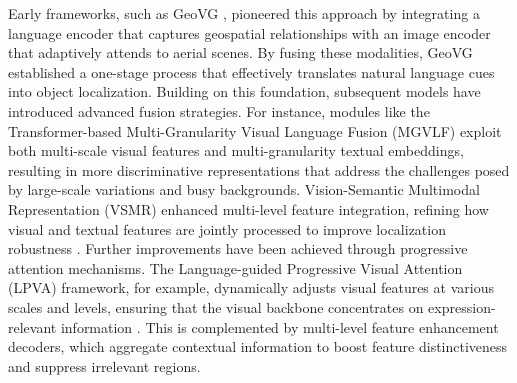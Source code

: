 Early frameworks, such as GeoVG \citep{sun2022visual}, pioneered this approach by integrating a language encoder that captures geospatial relationships with an image encoder that adaptively attends to aerial scenes. By fusing these modalities, GeoVG established a one-stage process that effectively translates natural language cues into object localization. Building on this foundation, subsequent models have introduced advanced fusion strategies. For instance, modules like the Transformer-based Multi-Granularity Visual Language Fusion (MGVLF) \citep{zhan2023rsvg} exploit both multi-scale visual features and multi-granularity textual embeddings, resulting in more discriminative representations that address the challenges posed by large-scale variations and busy backgrounds. Vision-Semantic Multimodal Representation (VSMR) enhanced multi-level feature integration, refining how visual and textual features are jointly processed to improve localization robustness \citep{ding2024visual}. Further improvements have been achieved through progressive attention mechanisms. The Language-guided Progressive Visual Attention (LPVA) framework, for example, dynamically adjusts visual features at various scales and levels, ensuring that the visual backbone concentrates on expression-relevant information \citep{li2024language}. This is complemented by multi-level feature enhancement decoders, which aggregate contextual information to boost feature distinctiveness and suppress irrelevant regions.